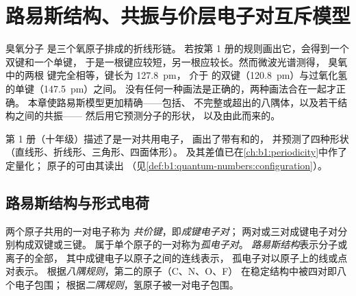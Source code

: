 \chapter{路易斯结构、共振与价层电子对互斥模型}\label{ch:b1:lewis-resonance-vsepr}

臭氧分子  是三个氧原子排成的折线形链。
若按第 1 册的规则画出它，会得到一个双键和一个单键，
于是一根键应较短，另一根应较长。然而微波光谱测得，
臭氧中的两根  键完全相等，键长为 \qty{127.8}{pm}，
介于  的双键（\qty{120.8}{pm}）与过氧化氢的单键（\qty{147.5}{pm}）之间。
没有任何一种画法是正确的，两种画法合在一起才正确。
本章使路易斯模型更加精确——包括、
不完整或超出的八隅体，以及若干结构之间的共振——
然后用它预测分子的形状，
以及由此而来的。

\begin{recall}
第 1 册（十年级）描述了是一对共用电子，
画出了带有和的，
并预测了四种形状（直线形、折线形、三角形、四面体形）。
及其差值已在\cref{ch:b1:periodicity}中作了定量化；
原子的可由其读出
（见\cref{def:b1:quantum-numbers:configuration}）。
\end{recall}

\section{路易斯结构与形式电荷}

\begin{definition}\label{def:b1:lewis-resonance-vsepr:lewis}
两个原子共用的一对电子称为
\emph{共价键}，即\emph{成键电子对}；
两对或三对成键电子对分别构成双键或三键。
属于单个原子的一对称为\emph{孤电子对}。
\emph{路易斯结构}表示分子或离子的全部，
其中成键电子以原子之间的连线表示，
孤电子对以原子上的线或点对表示。
根据\emph{八隅规则}，第二的原子（C、N、O、F）
在稳定结构中被四对即八个电子包围；
根据\emph{二隅规则}，氢原子被一对电子包围。
\end{definition}

